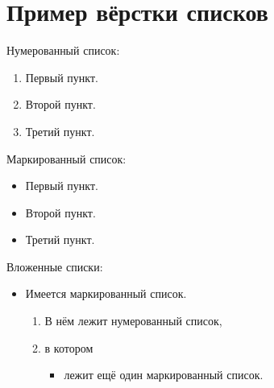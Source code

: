 \section{Пример вёрстки списков}\label{sec:ch2/sec3}

\noindent Нумерованный список:
\begin{enumerate}
  \item Первый пункт.
  \item Второй пункт.
  \item Третий пункт.
\end{enumerate}

\noindent Маркированный список:
\begin{itemize}
  \item Первый пункт.
  \item Второй пункт.
  \item Третий пункт.
\end{itemize}

\noindent Вложенные списки:
\begin{itemize}
  \item Имеется маркированный список.
  \begin{enumerate}
    \item В нём лежит нумерованный список,
    \item в котором
    \begin{itemize}
      \item лежит ещё один маркированный список.
    \end{itemize}
  \end{enumerate}
\end{itemize}

